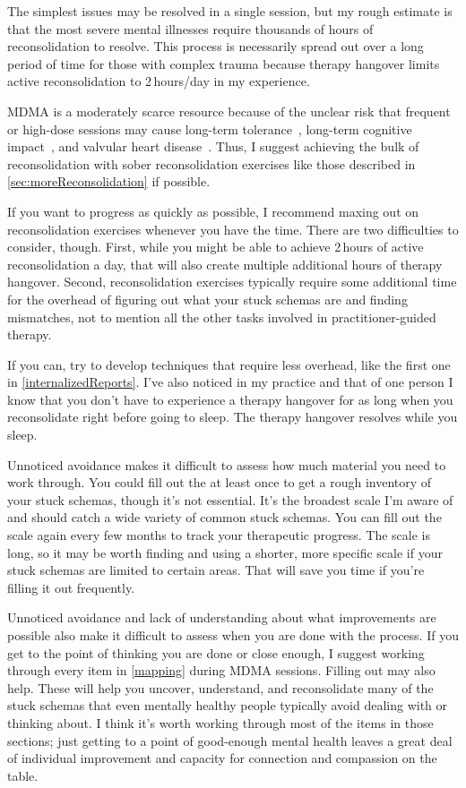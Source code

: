 \documentclass[11pt,oneside]{book}
\let\cite\parencite
\begin{document}
The simplest issues may be resolved in a single session, but my rough estimate is that the most severe mental illnesses require thousands of hours of reconsolidation to resolve. This process is necessarily spread out over a long period of time for those with complex trauma because therapy hangover limits active reconsolidation to 2\,hours/day in my experience.

MDMA is a moderately scarce resource because of the unclear risk that frequent or high-dose sessions may cause long-term tolerance~\cite{farreTolerance,parrottTolerance}, long-term cognitive impact~\cite{corayMemory}, and valvular heart disease~\cite{droogmans2007valvular}. Thus, I suggest achieving the bulk of reconsolidation with sober reconsolidation exercises like those described in \cref{sec:moreReconsolidation} if possible.

If you want to progress as quickly as possible, I recommend maxing out on reconsolidation exercises whenever you have the time. There are two difficulties to consider, though. First, while you might be able to achieve 2\,hours of active reconsolidation a day, that will also create multiple additional hours of therapy hangover. Second, reconsolidation exercises typically require some additional time for the overhead of figuring out what your stuck schemas are and finding mismatches, not to mention all the other tasks involved in practitioner-guided therapy.

If you can, try to develop techniques that require less overhead, like the first one in \cref{internalizedReports}. I've also noticed in my practice and that of one person I know that you don't have to experience a therapy hangover for as long when you reconsolidate right before going to sleep. The therapy hangover resolves while you sleep.

Unnoticed avoidance makes it difficult to assess how much material you need to work through. You could fill out the \textcite{maladaptiveSchemaScale} at least once to get a rough inventory of your stuck schemas, though it's not essential. It's the broadest scale I'm aware of and should catch a wide variety of common stuck schemas. You can fill out the scale again every few months to track your therapeutic progress. The scale is long, so it may be worth finding and using a shorter, more specific scale if your stuck schemas are limited to certain areas. That will save you time if you're filling it out frequently.

Unnoticed avoidance and lack of understanding about what improvements are possible also make it difficult to assess when you are done with the process. If you get to the point of thinking you are done or close enough, I suggest working through every item in \cref{mapping} during MDMA sessions. Filling out \textcite{maladaptiveSchemaScale} may also help. These will help you uncover, understand, and reconsolidate many of the stuck schemas that even mentally healthy people typically avoid dealing with or thinking about. I think it's worth working through most of the items in those sections; just getting to a point of good-enough mental health leaves a great deal of individual improvement and capacity for connection and compassion on the table.
\end{document}
